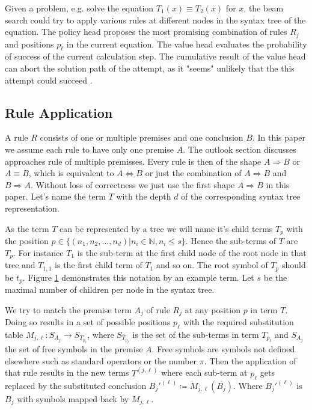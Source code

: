 \documentclass{scrartcl}
\theoremstyle{definition}
\begin{document}
Given a problem, e.g. solve the equation $T_1\left(x\right)\equiv T_2\left(x\right)$ for $x$,
the beam search could try to apply various rules at different nodes in the syntax tree of the equation.
The policy head proposes the most promising combination of rules $R_j$ and positions $p_\ell$ in the current equation.
The value head evaluates the probability of success of the current calculation step.
The cumulative result of the value head can abort the solution path of the attempt, as it "seems" unlikely that the this attempt could succeed \cite{44806}.

\subsection{Rule Application}

A rule $R$ consists of one or multiple premises and one conclusion $B$.
In this paper we assume each rule to have only one premise $A$.
The outlook section discusses approaches rule of multiple premisses. 
Every rule is then of the shape $A \Longrightarrow B$ or $A \equiv B$, which is equivalent to $A \Longleftrightarrow B$ or just the combination of $A \Longrightarrow B$ and $B \Longrightarrow A$.
Without loss of correctness we just use the first shape $A \Longrightarrow B$ in this paper.
Let's name the term $T$ with the depth $d$ of the corresponding syntax tree representation.

\begin{figure}[!htbp]
	\centering
	
	\label{fig:sxntax_tree}
\end{figure}

As the term $T$ can be represented by a tree we will name it's child terms $T_p$ with the position $p \in \big\{\left( n_1, n_2, \dots, n_d \right) | n_i \in \mathbb{N}, n_i \leq s \big\}$.
Hence the sub-terms of $T$ are $T_p$.
For instance $T_1$ is the sub-term at the first child node of the root node in that tree and $T_{1,1}$ is the first child term of $T_1$ and so on.
The root symbol of $T_p$ should be $t_p$.
Figure \ref{fig:sxntax_tree} demonstrates this notation by an example term.
Let $s$ be the maximal number of children per node in the syntax tree.

We try to match the premise term $A_j$ of rule $R_j$ at any position $p$ in term $T$.
Doing so results in a set of possible positions $p_\ell$ with the required substitution table ${M_{j,\ell}: S_{A_j} \to S_{T_{p_\ell}}}$,
where $S_{T_{p_\ell}}$ is the set of the sub-terms in term $T_{p_\ell}$ and $S_{A_j}$ the set of free symbols in the premise $A$.
Free symbols are symbols not defined elsewhere such as standard operators or the number $\pi$.
Then the application of that rule results in the new terms $T^{(j,\ell)}$ where each sub-term at $p_\ell$ gets replaced by the substituted conclusion ${B_j'^{(\ell)} \coloneqq M_{j,\ell}\left( B_j \right)}$.
Where $B_j'^{(\ell)}$ is $B_j$ with symbols mapped back by $M_{j,\ell}$. 
\end{document}
